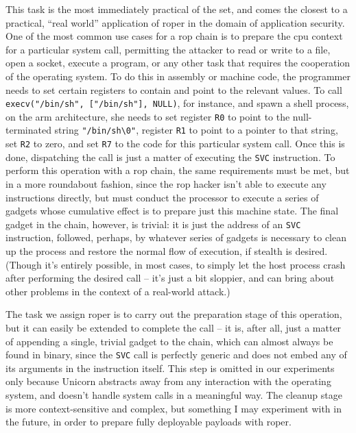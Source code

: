 \documentclass[12pt,glossary]{dalthesis}
\begin{document}
This task is the most immediately practical of the set, and comes the closest to
a practical, ``real world'' application of \gls{roper} in the domain of application
security. One of the most common use cases for a \gls{rop} chain is to prepare
the \gls{cpu} context for a particular system call, permitting the attacker to
read or write to a file, open a socket, execute a program, or any other task
that requires the cooperation of the operating system. To do this in assembly
or machine code, the programmer needs to set certain registers to contain and
point to the relevant values. To call \texttt{execv("/bin/sh", ["/bin/sh"], NULL)}, 
for instance, and spawn a shell process, on the \gls{arm} architecture, she needs
to set register \texttt{R0} to point to the null-terminated string \texttt{"/bin/sh\textbackslash{}0"}, 
register \texttt{R1} to point to a pointer to that string, set \texttt{R2} to zero, and
set \texttt{R7} to the code for this particular system call. Once this is done, dispatching
the call is just a matter of executing the \texttt{SVC} instruction. To perform this
operation with a \gls{rop} chain, the same requirements must be met, but in a more
roundabout fashion, since the \gls{rop} hacker isn't able to execute any instructions
directly, but must conduct the processor to execute a series of gadgets whose
cumulative effect is to prepare just this machine state. The final gadget in the
chain, however, is trivial: it is just the address of an \texttt{SVC} instruction, followed,
perhaps, by whatever series of gadgets is necessary to clean up the process and 
restore the normal flow of execution, if stealth is desired. (Though it's entirely
possible, in most cases, to simply let the host process crash after performing the
desired call -- it's just a bit sloppier, and can bring about other problems in the
context of a real-world attack.)

The task we assign \gls{roper} is to carry out the preparation stage of this operation,
but it can easily be extended to complete the call -- it is, after all, just a matter
of appending a single, trivial gadget to the chain, which can almost always be found
in binary, since the \texttt{SVC} call is perfectly generic and does not embed any of its
arguments in the instruction itself. This step is omitted in our experiments only
because Unicorn abstracts away from any interaction with the operating system, and
doesn't handle system calls in a meaningful way. The cleanup stage is more context-sensitive
and complex, but something I may experiment with in the future, in order to prepare
fully deployable payloads with \gls{roper}.
\end{document}

